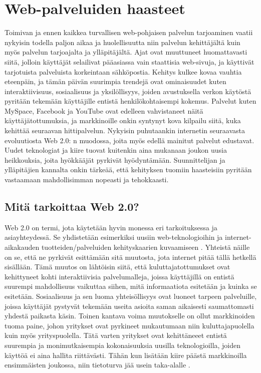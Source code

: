 
\chapter{Web-palveluiden haasteet}

Toimivan ja ennen kaikkea turvallisen web-pohjaisen palvelun tarjoaminen vaatii
nykyisin todella paljon aikaa ja huolellisuutta niin palvelun kehittäjältä kuin myös
palvelun tarjoajalta ja ylläpitäjältä. Ajat ovat muuttuneet huomattavasti siitä,
jolloin käyttäjät selailivat pääasiassa vain staattisia web-sivuja, ja käyttivät tarjotuista
palveluista korkeintaan sähköpostia. Kehitys kulkee kovaa vauhtia eteenpäin, ja
tämän päivän suurimpia trendejä ovat ominaisuudet kuten interaktiivisuus,
sosiaalisuus ja yksilöllisyys, joiden avustuksella verkon käytöstä pyritään tekemään
käyttäjille entistä henkilökohtaisempi kokemus. Palvelut kuten MySpace,
Facebook ja YouTube ovat edelleen vahvistaneet näitä käyttäjätottumuksia, ja
markkinoille onkin syntynyt kova kilpailu siitä, kuka kehittää seuraavan
hittipalvelun. Nykyisin puhutaankin internetin seuraavasta evoluutiosta Web 2.0:
n muodossa, joita myös edellä mainitut palvelut edustavat. Uudet teknologiat ja
kiire tuovat kuitenkin aina mukanaan joukon uusia heikkouksia, joita hyökkääjät
pyrkivät hyödyntämään. Suunnittelijan ja ylläpitäjien kannalta onkin tärkeää, että 
kehityksen tuomiin haasteisiin pyritään vastaamaan mahdollisimman nopeasti ja tehokkaasti.

\section{Mitä tarkoittaa Web 2.0?}

Web 2.0 on termi, jota käytetään hyvin monessa eri tarkoituksessa ja
asiayhteydessä. Se yhdistetään esimerkiksi uusiin web-teknologioihin ja internet-
aikakauden tuotteiden/palveluiden kehityskaarien kuvaamiseen \cite{WEB2}. Yhteistä näille
on se, että ne pyrkivät esittämään sitä muutosta, jota internet pitää tällä
hetkellä sisällään. Tämä muutos on lähtöisin siitä, että kuluttajatottumukset
ovat kehittyneet kohti interaktiivisia palvelumalleja, joissa käyttäjillä on
entistä suurempi mahdollisuus vaikuttaa siihen, mitä informaatiota esitetään ja kuinka se esitetään.
Sosiaalisuus ja sen luoma yhteisöllisyys ovat luoneet tarpeen palveluille,
joissa käyttäjät pystyvät tekemään useita asioita saman aikaisesti saumattomasti
yhdestä paikasta käsin. Toinen kantava voima  muutokselle on ollut markkinoiden
tuoma paine, johon yritykset ovat pyrkineet mukautumaan niin kuluttajapuolella kuin myös
yrityspuolella. Tätä varten yritykset ovat kehittäneeet entistä suurempia ja 
monimutkaisempia kokonaisuuksia uusilla teknologioilla, joiden käyttöä ei aina hallita
riittävästi. Tähän kun lisätään kiire päästä markkinoilla ensimmäisten
joukossa, niin tietoturva jää usein taka-alalle \cite{WEB2b}.

